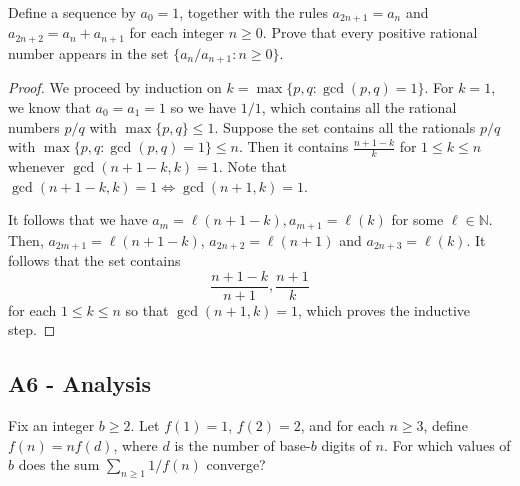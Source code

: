 \documentclass[11pt]{scrartcl}
\newcommand{\N}{\mathbb{N}}
\newcommand{\<}{\langle}
\renewcommand{\>}{\rangle}
\begin{document}
Define a sequence by $a_0 = 1$, together with the rules $a_{2n+1} = a_n$ and $a_{2n+2} = a_n + a_{n+1}$ for each integer $n \ge 0$.  Prove that every positive rational number appears in the set $\{a_n/a_{n+1}: n \ge 0\}$.

\begin{proof}
We proceed by induction on $k = \max\{p, q: \gcd(p, q) = 1\}$.  For $k = 1$, we know that $a_0 = a_1 = 1$ so we have $1/1$, which contains all the rational numbers $p/q$ with $\max\{p, q\} \le 1$.  Suppose the set contains all the rationals $p/q$ with $\max\{p, q: \gcd(p, q) = 1\} \le n$.  Then it contains $\frac{n+1-k}{k}$ for $1 \le k \le n$ whenever $\gcd(n+1-k, k) = 1$.  Note that $\gcd(n+1 - k, k) = 1 \Leftrightarrow \gcd(n+1, k) = 1$.

It follows that we have $a_m = \ell(n + 1 - k), a_{m+1} = \ell(k)$ for some $\ell \in \N$.  Then, $a_{2m+1} = \ell(n+1-k)$, $a_{2n+2} = \ell(n+1)$ and $a_{2n+3} = \ell(k)$.  It follows that the set contains 
$$\frac{n+1-k}{n+1}, \frac{n+1}{k}$$
for each $1 \le k\le n$ so that $\gcd(n+1, k) = 1$, which proves the inductive step.  
\end{proof}

\subsection{A6 - Analysis}
Fix an integer $b \ge 2$.  Let $f(1) = 1$, $f(2) = 2$, and for each $n \ge 3$, define $f(n) = nf(d)$, where $d$ is the number of base-$b$ digits of $n$.  For which values of $b$ does the sum $\sum_{n \ge 1} 1/f(n)$ converge?
\end{document}
